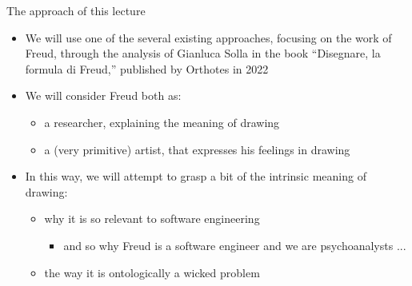 \documentclass{beamer}
\begin{document}
\begin{frame}
{\centerline{The approach of this lecture}}
 
\begin{itemize}
\item We will use one of the several existing approaches, focusing on the work of Freud, through the analysis of Gianluca Solla in the book ``Disegnare, la formula di Freud,'' published by Orthotes in 2022
\item We will consider Freud both as:
\begin{itemize}
\item a researcher, explaining the meaning of drawing
\item a (very primitive) artist, that expresses his feelings in drawing
\end{itemize} 
\item In this way, we will attempt to grasp a bit of the intrinsic meaning of drawing:
\begin{itemize}
\item why it is so relevant to software engineering
\begin{itemize}
\item and so why Freud is a software engineer and we are psychoanalysts ...
\end{itemize} 
\item the way it is ontologically a wicked problem
\end{itemize} 
\end{itemize} 

\end{frame}
\end{document}
